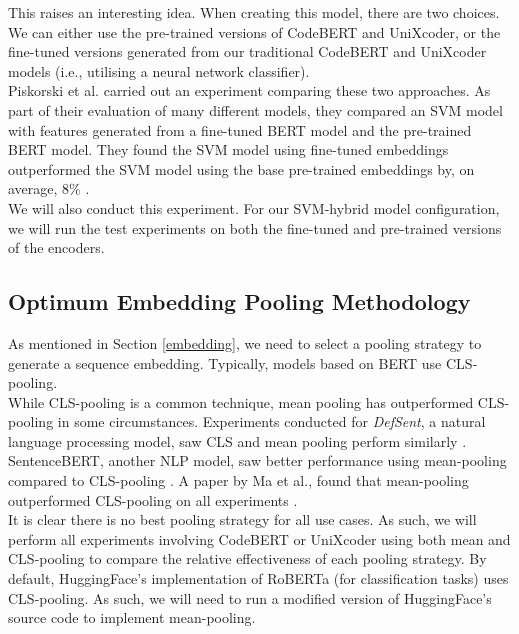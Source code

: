 \noindent
This raises an interesting idea. When creating this model, there are two choices. We can either use the pre-trained versions of CodeBERT and UniXcoder, or the fine-tuned versions generated from our traditional CodeBERT and UniXcoder models (i.e., utilising a neural network classifier). \\

\noindent
Piskorski et al. carried out an experiment comparing these two approaches. As part of their evaluation of many different models, they compared an SVM model with features generated from a fine-tuned BERT model and the pre-trained BERT model. They found the SVM model using fine-tuned embeddings outperformed the SVM model using the base pre-trained embeddings by, on average, $8\%$ \cite{svm-with-embeddings}. \\


\noindent
We will also conduct this experiment. For our SVM-hybrid model configuration, we will run the test experiments on both the fine-tuned and pre-trained versions of the encoders.

\subsection{Optimum Embedding Pooling Methodology}
\label{optimum_pooling}
As mentioned in Section \ref{embedding}, we need to select a pooling strategy to generate a sequence embedding. Typically, models based on BERT use CLS-pooling. \\

\noindent
While CLS-pooling is a common technique, mean pooling has outperformed CLS-pooling in some circumstances. Experiments conducted for \emph{DefSent}, a natural language processing model, saw CLS and mean pooling perform similarly \cite{tsukagoshi2021defsent}. SentenceBERT, another NLP model, saw better performance using mean-pooling compared to CLS-pooling \cite{reimers2019sentence}. A paper by Ma et al., found that mean-pooling outperformed CLS-pooling on all experiments \cite{ma2019universal}. \\

\noindent
It is clear there is no best pooling strategy for all use cases. As such, we will perform all experiments involving CodeBERT or UniXcoder using both mean and CLS-pooling to compare the relative effectiveness of each pooling strategy. By default, HuggingFace's implementation of RoBERTa (for classification tasks) uses CLS-pooling. As such, we will need to run a modified version of HuggingFace's source code to implement mean-pooling. \\